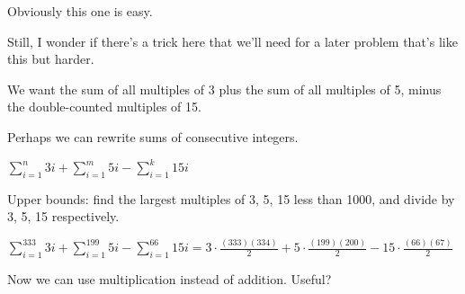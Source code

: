 Obviously this one is easy.

Still, I wonder if there's a trick here that we'll need for a later problem that's like this but harder.

We want the sum of all multiples of 3 plus the sum of all multiples of 5, minus the double-counted multiples of 15.

Perhaps we can rewrite sums of consecutive integers.

$ \sum_{i = 1}^{n}3i + \sum_{i = 1}^{m}5i - \sum_{i = 1}^{k}15i $

Upper bounds: find the largest multiples of 3, 5, 15 less than 1000, and divide by 3, 5, 15 respectively.

$ \sum_{i = 1}^{333}3i + \sum_{i = 1}^{199}5i - \sum_{i = 1}^{66}15i =
3\cdot\frac{(333)(334)}{2} + 5\cdot\frac{(199)(200)}{2} - 15\cdot\frac{(66)(67)}{2} $

Now we can use multiplication instead of addition. Useful?